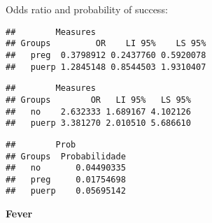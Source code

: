 \documentclass[
]{article}
\newenvironment{Shaded}{\begin{snugshade}}{\end{snugshade}}
\newcommand{\CommentTok}[1]{\textcolor[rgb]{0.56,0.35,0.01}{\textit{#1}}}
\newcommand{\KeywordTok}[1]{\textcolor[rgb]{0.13,0.29,0.53}{\textbf{#1}}}
\newcommand{\NormalTok}[1]{#1}
\newcommand{\OperatorTok}[1]{\textcolor[rgb]{0.81,0.36,0.00}{\textbf{#1}}}
\begin{document}
Odds ratio and probability of success:

\begin{Shaded}
\end{Shaded}

\begin{verbatim}
##        Measures
## Groups         OR    LI 95%    LS 95%
##   preg  0.3798912 0.2437760 0.5920078
##   puerp 1.2845148 0.8544503 1.9310407
\end{verbatim}

\begin{Shaded}
\end{Shaded}

\begin{verbatim}
##        Measures
## Groups        OR   LI 95%   LS 95%
##   no    2.632333 1.689167 4.102126
##   puerp 3.381270 2.010510 5.686610
\end{verbatim}

\begin{Shaded}
\end{Shaded}

\begin{verbatim}
##        Prob
## Groups  Probabilidade
##   no       0.04490335
##   preg     0.01754698
##   puerp    0.05695142
\end{verbatim}

\textbf{Fever}
\end{document}
